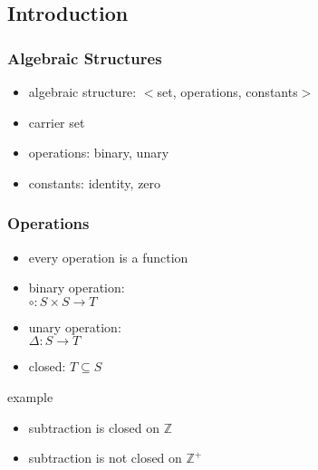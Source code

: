 \documentclass[dvipsnames]{beamer}
\begin{document}
\subsection{Introduction}

\begin{frame}
  \frametitle{Algebraic Structures}

  \begin{itemize}
    \item \alert{algebraic structure}: $<$set, operations, constants$>$

    \bigskip
    \item carrier set
    \item operations: binary, unary
    \item constants: identity, zero
  \end{itemize}
\end{frame}

\begin{frame}
  \frametitle{Operations}

  \begin{itemize}
    \item every operation is a function

    \medskip
    \item binary operation:\\
      $\circ: S \times S \rightarrow T$
    \item unary operation:\\
      $\Delta: S \rightarrow T$

    \pause
    \medskip
    \item \alert{closed}: $T \subseteq S$
  \end{itemize}
  \begin{exampleblock}{example}
    \begin{itemize}
      \item subtraction is closed on $\mathbb{Z}$
      \item subtraction is not closed on $\mathbb{Z^+}$
    \end{itemize}
  \end{exampleblock}
\end{frame}
\end{document}
